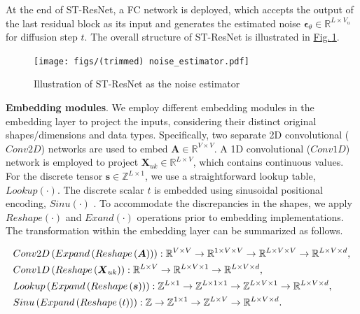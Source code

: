 \documentclass[a4paper,fleqn,12pt]{cas-sc}
\begin{document}
\noindent At the end of ST-ResNet, a FC network is deployed, which accepts the output of the last residual block as its input and generates the estimated noise $\boldsymbol{\epsilon}_{\theta}\in\mathbb{R}^{L\times V_{u}}$ for diffusion step $t$. The overall structure of ST-ResNet is illustrated in \hyperref[fig:noise_estimator_architecture]{Fig.\,\ref{fig:noise_estimator_architecture}}.

\begin{figure}[pos=htbp,width=9cm,align=\centering]
  \centering 
  \texttt{[image: figs/(trimmed) noise\_estimator.pdf]}
  \caption{Illustration of ST-ResNet as the noise estimator}\label{fig:noise_estimator_architecture}
\end{figure}

\noindent\textbf{Embedding modules}. We employ different embedding modules in the embedding layer to project the inputs, considering their distinct original shapes/dimensions and data types. Specifically, two separate 2D convolutional ($Conv2D$) networks are used to embed $\boldsymbol{A}\in\mathbb{R}^{V\times V}$. A 1D convolutional ($Conv1D$) network is employed to project $\boldsymbol{X}_{uk}\in\mathbb{R}^{L\times V}$, which contains continuous values. For the discrete tensor $\boldsymbol{s}\in\mathbb{Z}^{L\times 1}$, we use a straightforward lookup table, $Lookup(\cdot)$. The discrete scalar $t$ is embedded using sinusoidal positional encoding, $Sinu(\cdot)$ \citep{vaswani2017attention}. To accommodate the discrepancies in the shapes, we apply $Reshape(\cdot)$ and $Exand(\cdot)$ operations prior to embedding implementations. The transformation within the embedding layer can be summarized as follows.
\begin{linenomath*}
\begin{align}
&Conv2D\left(Expand\left(Reshape\left(\boldsymbol{A}\right)\right)\right) : \mathbb{R}^{V\times V}\rightarrow\mathbb{R}^{1\times V\times V}\rightarrow\mathbb{R}^{L\times V\times V}\rightarrow\mathbb{R}^{L\times V\times d},\notag\\
&Conv1D\left(Reshape\left(\boldsymbol{X}_{uk}\right)\right) : \mathbb{R}^{L\times V}\rightarrow\mathbb{R}^{L\times V\times 1}\rightarrow\mathbb{R}^{L\times V\times d}, \\
&Lookup\left(Expand\left(Reshape\left(\boldsymbol{s}\right)\right)\right) : \mathbb{Z}^{L\times 1}\rightarrow\mathbb{Z}^{L\times 1\times 1}\rightarrow\mathbb{Z}^{L\times V\times 1}\rightarrow\mathbb{R}^{L\times V\times d},\notag\\
&Sinu\left(Expand\left(Reshape\left(t\right)\right)\right) : \mathbb{Z}\rightarrow\mathbb{Z}^{1\times 1}\rightarrow\mathbb{Z}^{L\times V}\rightarrow\mathbb{R}^{L\times V\times d}.\notag
\end{align}
\end{linenomath*}
\end{document}
